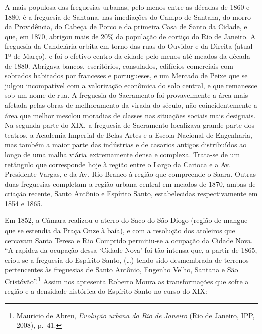 A mais populosa das freguesias urbanas, pelo menos entre as décadas de
1860 e 1880, é a freguesia de Santana, nas imediações do Campo de
Santana, do morro da Providência, do Cabeça de Porco e da primeira Casa
de Santo da Cidade, e que, em 1870, abrigou mais de 20\% da população de
cortiço do Rio de Janeiro. A freguesia da Candelária orbita em torno das
ruas do Ouvidor e da Direita (atual 1º de Março), e foi o efetivo centro
da cidade pelo menos até meados da década de 1880. Abrigava bancos,
escritórios, consulados, edifícios comerciais com sobrados habitados por
franceses e portugueses, e um Mercado de Peixe que se julgou
incompatível com a valorização econômica do solo central, e que
remanesce sob um nome de rua. A freguesia do Sacramento foi
provavelmente a área mais afetada pelas obras de melhoramento da virada
do século, não coincidentemente a área que melhor mesclou moradias de
classes nas situações sociais mais desiguais. Na segunda parte do XIX, a
freguesia de Sacramento localizava grande parte dos teatros, a Academia
Imperial de Belas Artes e a Escola Nacional de Engenharia, mas também a
maior parte das indústrias e de casarios antigos distribuídos ao longo
de uma malha viária extremamente densa e complexa. Trata-se de um
retângulo que corresponde hoje à região entre o Largo da Carioca e a Av.
Presidente Vargas, e da Av. Rio Branco à região que compreende o Saara.
Outras duas freguesias completam a região urbana central em meados de
1870, ambas de criação recente, Santo Antônio e Espírito Santo,
estabelecidas respectivamente em 1854 e 1865.

Em 1852, a Câmara realizou o aterro do Saco do São Diogo (região de
mangue que se estendia da Praça Onze à baía), e com a resolução dos
atoleiros que cercavam Santa Teresa e Rio Comprido permitiu-se a
ocupação da Cidade Nova. ``A rapidez da ocupação dessa `Cidade Nova' foi
tão intensa que, a partir de 1865, criou-se a freguesia do Espírito
Santo, (\ldots{}) tendo sido desmembrada de terrenos pertencentes às
freguesias de Santo Antônio, Engenho Velho, Santana e São
Cristóvão''.\footnote{Mauricio de Abreu, \emph{Evolução urbana do Rio de
  Janeiro} (Rio de Janeiro, IPP, 2008), p.~41.} Assim nos apresenta
Roberto Moura as transformações que sofre a região e a densidade
histórica do Espírito Santo no curso do XIX:

